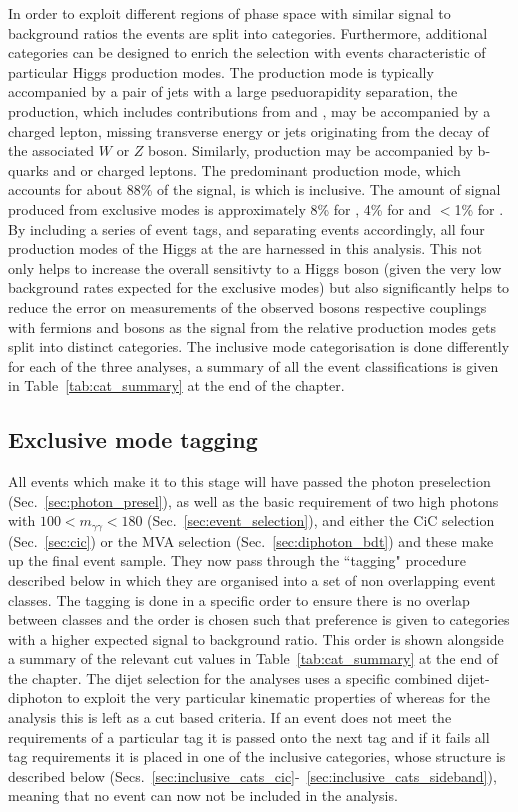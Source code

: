 In order to exploit different regions of phase space with similar signal to background ratios the events are split into categories. Furthermore, additional categories can be designed to enrich the selection with events characteristic of particular Higgs production modes. The \VBF production mode is typically accompanied by a pair of jets with a large pseduorapidity separation, the \VH production, which includes contributions from \WH and \ZH, may be accompanied by a charged lepton, missing transverse energy or jets originating from the decay of the associated $W$ or $Z$ boson. Similarly, \ttH production may be accompanied by b-quarks and or charged leptons. The predominant production mode, which accounts for about 88\% of the signal, is \ggH which is inclusive. The amount of signal produced from exclusive modes is approximately 8\% for \VBF, 4\% for \VH and $<$1\% for \ttH. By including a series of event tags, and separating events accordingly, all four production modes of the Higgs at the \LHC are harnessed in this analysis. This not only helps to increase the overall sensitivty to a \SM Higgs boson (given the very low background rates expected for the exclusive modes) but also significantly helps to reduce the error on measurements of the observed bosons respective couplings with fermions and bosons as the signal from the relative production modes gets split into distinct categories. The inclusive mode categorisation is done differently for each of the three analyses, a summary of all the event classifications is given in Table~\ref{tab:cat_summary} at the end of the chapter.

\subsection{Exclusive mode tagging}
\label{sec:exclusive_tags}
All events which make it to this stage will have passed the photon preselection (Sec.~\ref{sec:photon_presel}), as well as the basic requirement of two high \pT photons with $100<m_{\gamma\gamma}<180$ (Sec.~\ref{sec:event_selection}), and either the CiC selection (Sec.~\ref{sec:cic}) or the MVA selection (Sec.~\ref{sec:diphoton_bdt}) and these make up the final event sample. They now pass through the ``tagging" procedure described below in which they are organised into a set of non overlapping event classes. The tagging is done in a specific order to ensure there is no overlap between classes and the order is chosen such that preference is given to categories with a higher expected signal to background ratio. This order is shown alongside a summary of the relevant cut values in Table~\ref{tab:cat_summary} at the end of the chapter. The dijet selection for the \MVA analyses uses a specific combined dijet-diphoton \BDT to exploit the very particular kinematic properties of \VBF whereas for the \CiC analysis this is left as a cut based criteria. If an event does not meet the requirements of a particular tag it is passed onto the next tag and if it fails all tag requirements it is placed in one of the inclusive categories, whose structure is described below (Secs.~\ref{sec:inclusive_cats_cic}-~\ref{sec:inclusive_cats_sideband}), meaning that no event can now not be included in the analysis. 

